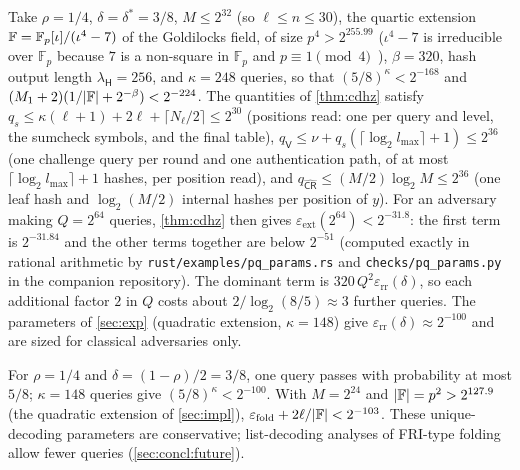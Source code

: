 \begin{remark}\label{rem:pq-params}
Take $\rho = 1/4$, $\delta = \delta^* = 3/8$, $M \le 2^{32}$ (so $\ell \le n \le 30$), the quartic extension $\mathbb{F} = \mathbb{F}_p[\iota]/(\iota^4 - 7)$ of the Goldilocks field, of size $p^4 > 2^{255.99}$ ($\iota^4 - 7$ is irreducible over $\mathbb{F}_p$ because $7$ is a non-square in $\mathbb{F}_p$ and $p \equiv 1 \pmod 4$~\cite[Theorem~3.75]{LN97}), $\beta = 320$, hash output length $\lambda_{\mathsf{H}} = 256$, and $\kappa = 248$ queries, so that $(5/8)^{\kappa} < 2^{-168}$ and $(M_1+2)(1/|\mathbb{F}| + 2^{-\beta}) < 2^{-224}$.
The quantities of \cref{thm:cdhz} satisfy $q_s \le \kappa(\ell+1) + 2\ell + \lceil N_\ell/2 \rceil \le 2^{30}$ (positions read: one per query and level, the sumcheck symbols, and the final table), $q_{\mathsf{V}} \le \nu + q_s(\lceil\log_2 l_{\max}\rceil + 1) \le 2^{36}$ (one challenge query per round and one authentication path, of at most $\lceil\log_2 l_{\max}\rceil + 1$ hashes, per position read), and $q_{\widehat{\mathsf{CR}}} \le (M/2)\log_2 M \le 2^{36}$ (one leaf hash and $\log_2(M/2)$ internal hashes per position of $y$).
For an adversary making $Q = 2^{64}$ queries, \cref{thm:cdhz} then gives $\varepsilon_{\mathrm{ext}}(2^{64}) < 2^{-31.8}$: the first term is $2^{-31.84}$ and the other terms together are below $2^{-51}$ (computed exactly in rational arithmetic by \texttt{rust/examples/pq\_params.rs} and \texttt{checks/pq\_params.py} in the companion repository).
The dominant term is $320\, Q^2 \varepsilon_{\mathrm{rr}}(\delta)$, so each additional factor $2$ in $Q$ costs about $2/\log_2(8/5) \approx 3$ further queries.
The parameters of \cref{sec:exp} (quadratic extension, $\kappa = 148$) give $\varepsilon_{\mathrm{rr}}(\delta) \approx 2^{-100}$ and are sized for classical adversaries only.
\end{remark}

\begin{remark}[Parameters]\label{rem:params}
For $\rho = 1/4$ and $\delta = (1-\rho)/2 = 3/8$, one query passes with probability at most $5/8$; $\kappa = 148$ queries give $(5/8)^{\kappa} < 2^{-100}$.
With $M = 2^{24}$ and $|\mathbb{F}| = p^2 > 2^{127.9}$ (the quadratic extension of \cref{sec:impl}), $\varepsilon_{\mathrm{fold}} + 2\ell/|\mathbb{F}| < 2^{-103}$.
These unique-decoding parameters are conservative; list-decoding analyses of FRI-type folding~\cite{BCIKS23} allow fewer queries (\cref{sec:concl:future}).
\end{remark}

